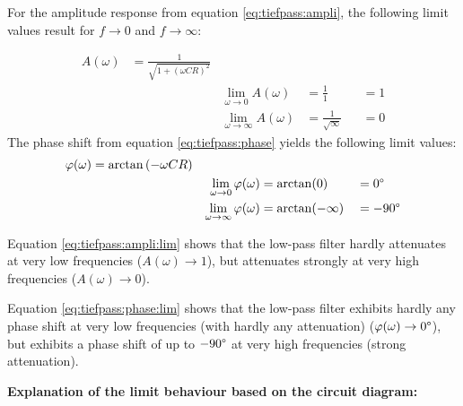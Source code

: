 \begin{frame}[t]
{    For the amplitude response from equation \ref{eq:tiefpass:ampli}, the following limit values result
    for $f \rightarrow 0$ and $f \rightarrow \infty$:

    \begin{align}
        &&A(\omega) &=\frac{1}{\sqrt{1 + (\omega CR)^2}}    &                                           &                           &   &    &&\nonumber\\
        &&          &                                       &   \lim_{\omega \rightarrow 0}A(\omega)    &=\frac{1}{1}               &   &=1  &&\label{eq:tiefpass:ampli:lim}\\
        &&          &                                       &   \lim_{\omega \rightarrow \infty}A(\omega)&=\frac{1}{\sqrt{\infty}}  &   &=0  &&\nonumber
    \end{align}
    The phase shift from equation \ref{eq:tiefpass:phase} yields the following limit values:
    \begin{align}
        &&\varphi(\omega)   &=\arctan\left(-\omega CR\right)&                                                   &                   &   &           &&\nonumber\\
        &&                  &                               &   \lim_{\omega \rightarrow 0}\varphi(\omega)      &=\arctan(0)        &   &=0\degree  &&\label{eq:tiefpass:phase:lim}\\
        &&                  &                               &   \lim_{\omega \rightarrow \infty}\varphi(\omega) &=\arctan(-\infty)  &   &=-90\degree&&\nonumber
    \end{align}

    
    Equation \ref{eq:tiefpass:ampli:lim} shows that the low-pass filter hardly attenuates at very low frequencies ($A(\omega) \rightarrow 1$), 
    but attenuates strongly at very high frequencies ($A(\omega) \rightarrow 0$).
    
    Equation \ref{eq:tiefpass:phase:lim} shows that the low-pass filter exhibits hardly any phase shift at very low frequencies (with hardly any attenuation) 
    ($\varphi(\omega) \rightarrow 0\degree$), but exhibits a phase shift of up to $-90\degree$ at very high frequencies (strong attenuation). 

    \textbf{Explanation of the limit behaviour based on the circuit diagram:}

}
\end{frame}
